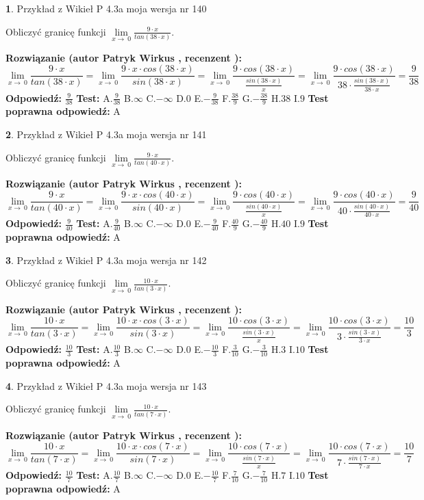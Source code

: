 \documentclass[12pt, a4paper]{article}
\theoremstyle{definition} %
\newtheorem{zad}{}
\newcommand{\zadStart}[1]{\begin{zad}#1\newline}
\newcommand{\zadStop}{\end{zad}}
\newcommand{\rozwStart}[2]{\noindent \textbf{Rozwiązanie (autor #1 , recenzent #2): }\newline}
\newcommand{\rozwStop}{\newline}
\newcommand{\odpStart}{\noindent \textbf{Odpowiedź:}\newline}
\newcommand{\odpStop}{\newline}
\newcommand{\testStart}{\noindent \textbf{Test:}\newline}
\newcommand{\testStop}{\newline}
\newcommand{\kluczStart}{\noindent \textbf{Test poprawna odpowiedź:}\newline}
\newcommand{\kluczStop}{\newline}
\begin{document}
\zadStart{Przykład z Wikieł P 4.3a moja wersja nr 140}


Obliczyć granicę funkcji $\lim\limits_{x\to\ 0}\frac{9 \cdot x}{tan(38 \cdot x)}$.
\zadStop
\rozwStart{Patryk Wirkus}{}
$$\lim\limits_{x\to\ 0}\frac{9 \cdot x}{tan(38 \cdot x)}=\lim\limits_{x\to\ 0}\frac{9 \cdot x \cdot cos(38 \cdot x)}{sin(38 \cdot x)}=\lim\limits_{x\to\ 0}\frac{9 \cdot cos(38 \cdot x)}{\frac{sin(38 \cdot x)}{x}}=\lim\limits_{x\to\ 0}\frac{9 \cdot cos(38 \cdot x)}{38 \cdot \frac{sin(38 \cdot x)}{38 \cdot x}} = \frac{9}{38}$$
\rozwStop
\odpStart
$\frac{9}{38}$
\odpStop
\testStart
A.$\frac{9}{38}$
B.$\infty$
C.$-\infty$
D.$0$
E.$-\frac{9}{38}$
F.$\frac{38}{9}$
G.$-\frac{38}{9}$
H.$38$
I.$9$
\testStop
\kluczStart
A
\kluczStop



\zadStart{Przykład z Wikieł P 4.3a moja wersja nr 141}


Obliczyć granicę funkcji $\lim\limits_{x\to\ 0}\frac{9 \cdot x}{tan(40 \cdot x)}$.
\zadStop
\rozwStart{Patryk Wirkus}{}
$$\lim\limits_{x\to\ 0}\frac{9 \cdot x}{tan(40 \cdot x)}=\lim\limits_{x\to\ 0}\frac{9 \cdot x \cdot cos(40 \cdot x)}{sin(40 \cdot x)}=\lim\limits_{x\to\ 0}\frac{9 \cdot cos(40 \cdot x)}{\frac{sin(40 \cdot x)}{x}}=\lim\limits_{x\to\ 0}\frac{9 \cdot cos(40 \cdot x)}{40 \cdot \frac{sin(40 \cdot x)}{40 \cdot x}} = \frac{9}{40}$$
\rozwStop
\odpStart
$\frac{9}{40}$
\odpStop
\testStart
A.$\frac{9}{40}$
B.$\infty$
C.$-\infty$
D.$0$
E.$-\frac{9}{40}$
F.$\frac{40}{9}$
G.$-\frac{40}{9}$
H.$40$
I.$9$
\testStop
\kluczStart
A
\kluczStop



\zadStart{Przykład z Wikieł P 4.3a moja wersja nr 142}


Obliczyć granicę funkcji $\lim\limits_{x\to\ 0}\frac{10 \cdot x}{tan(3 \cdot x)}$.
\zadStop
\rozwStart{Patryk Wirkus}{}
$$\lim\limits_{x\to\ 0}\frac{10 \cdot x}{tan(3 \cdot x)}=\lim\limits_{x\to\ 0}\frac{10 \cdot x \cdot cos(3 \cdot x)}{sin(3 \cdot x)}=\lim\limits_{x\to\ 0}\frac{10 \cdot cos(3 \cdot x)}{\frac{sin(3 \cdot x)}{x}}=\lim\limits_{x\to\ 0}\frac{10 \cdot cos(3 \cdot x)}{3 \cdot \frac{sin(3 \cdot x)}{3 \cdot x}} = \frac{10}{3}$$
\rozwStop
\odpStart
$\frac{10}{3}$
\odpStop
\testStart
A.$\frac{10}{3}$
B.$\infty$
C.$-\infty$
D.$0$
E.$-\frac{10}{3}$
F.$\frac{3}{10}$
G.$-\frac{3}{10}$
H.$3$
I.$10$
\testStop
\kluczStart
A
\kluczStop



\zadStart{Przykład z Wikieł P 4.3a moja wersja nr 143}


Obliczyć granicę funkcji $\lim\limits_{x\to\ 0}\frac{10 \cdot x}{tan(7 \cdot x)}$.
\zadStop
\rozwStart{Patryk Wirkus}{}
$$\lim\limits_{x\to\ 0}\frac{10 \cdot x}{tan(7 \cdot x)}=\lim\limits_{x\to\ 0}\frac{10 \cdot x \cdot cos(7 \cdot x)}{sin(7 \cdot x)}=\lim\limits_{x\to\ 0}\frac{10 \cdot cos(7 \cdot x)}{\frac{sin(7 \cdot x)}{x}}=\lim\limits_{x\to\ 0}\frac{10 \cdot cos(7 \cdot x)}{7 \cdot \frac{sin(7 \cdot x)}{7 \cdot x}} = \frac{10}{7}$$
\rozwStop
\odpStart
$\frac{10}{7}$
\odpStop
\testStart
A.$\frac{10}{7}$
B.$\infty$
C.$-\infty$
D.$0$
E.$-\frac{10}{7}$
F.$\frac{7}{10}$
G.$-\frac{7}{10}$
H.$7$
I.$10$
\testStop
\kluczStart
A
\kluczStop
\end{document}
